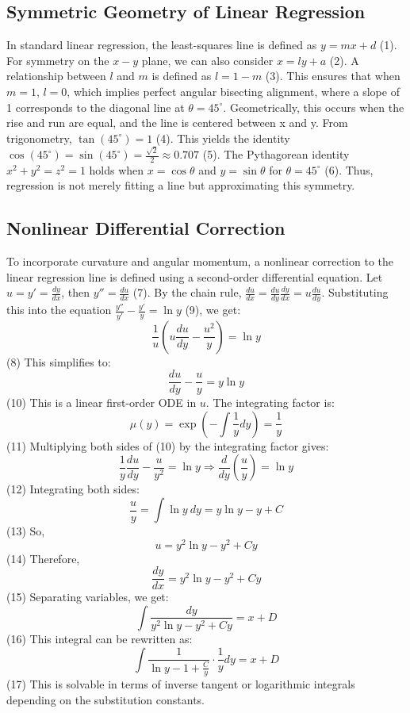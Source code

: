 ﻿\documentclass[12pt]{article}
\begin{document}
\subsection{Symmetric Geometry of Linear Regression}
In standard linear regression, the least-squares line is defined as $y=mx+d$ (1). For symmetry on the $x-y$ plane, we can also consider $x=ly+a$ (2). A relationship between $l$ and $m$ is defined as $l=1-m$ (3). This ensures that when $m=1$, $l=0$, which implies perfect angular bisecting alignment, where a slope of 1 corresponds to the diagonal line at $\theta=45^{\circ}$. Geometrically, this occurs when the rise and run are equal, and the line is centered between x and y. From trigonometry, $\tan(45^{\circ})=1$ (4). This yields the identity $\cos(45^{\circ})=\sin(45^{\circ})=\frac{\sqrt{2}}{2}\approx0.707$ (5). The Pythagorean identity $x^2+y^2=z^2=1$ holds when $x=\cos\theta$ and $y=\sin\theta$ for $\theta=45^{\circ}$ (6). Thus, regression is not merely fitting a line but approximating this symmetry.

\subsection{Nonlinear Differential Correction}
To incorporate curvature and angular momentum, a nonlinear correction to the linear regression line is defined using a second-order differential equation. Let $u=y'=\frac{dy}{dx}$, then $y''=\frac{du}{dx}$ (7). By the chain rule, $\frac{du}{dx}=\frac{du}{dy}\frac{dy}{dx}=u\frac{du}{dy}$. Substituting this into the equation $\frac{y''}{y'} - \frac{y'}{y} = \ln y$ (9), we get:
$$ \frac{1}{u}\left(u\frac{du}{dy}-\frac{u^2}{y}\right)=\ln y $$ (8)
This simplifies to:
$$ \frac{du}{dy}-\frac{u}{y}=y\ln y $$ (10)
This is a linear first-order ODE in $u$. The integrating factor is:
$$ \mu(y)=\exp\left(-\int\frac{1}{y}dy\right)=\frac{1}{y} $$ (11)
Multiplying both sides of (10) by the integrating factor gives:
$$ \frac{1}{y}\frac{du}{dy}-\frac{u}{y^2}=\ln y \Rightarrow \frac{d}{dy}\left(\frac{u}{y}\right)=\ln y $$ (12)
Integrating both sides:
$$ \frac{u}{y}=\int \ln y~dy=y\ln y-y+C $$ (13)
So,
$$ u=y^2\ln y-y^2+Cy $$ (14)
Therefore,
$$ \frac{dy}{dx}=y^2\ln y-y^2+Cy $$ (15)
Separating variables, we get:
$$ \int\frac{dy}{y^2\ln y-y^2+Cy}=x+D $$ (16)
This integral can be rewritten as:
$$ \int\frac{1}{\ln y-1+\frac{C}{y}}\cdot\frac{1}{y}dy=x+D $$ (17)
This is solvable in terms of inverse tangent or logarithmic integrals depending on the substitution constants.
\end{document}
